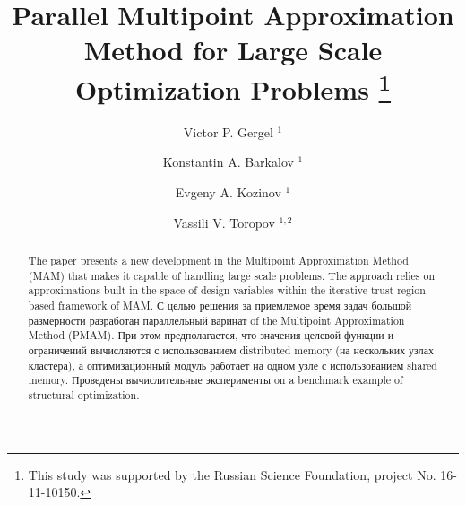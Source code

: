 \documentclass[runningheads,a4paper]{llncs}
\begin{document}
\mainmatter  %

\title{Parallel Multipoint Approximation Method for Large Scale Optimization Problems 
\thanks{This study was supported by the Russian Science Foundation, project No. 16-11-10150.}}


\author{ Victor P. Gergel%
$^1$ \and
Konstantin A. Barkalov%
$^1$ \and
Evgeny A. Kozinov%
$^1$ \and
Vassili V. Toropov%
$^{1,2}$
}
%


%
%

\maketitle

\begin{abstract}
The paper presents a new development in the Multipoint Approximation Method (MAM) that makes it capable of handling large scale problems. The approach relies on approximations built in the space of design variables within the iterative trust-region-based framework of MAM. 
\Russian
С целью решения за приемлемое время задач большой размерности разработан параллельный варинат of the Multipoint Approximation Method (PMAM). При этом предполагается, что значения целевой функции и ограничений вычисляются с использованием distributed memory (на нескольких узлах кластера), а оптимизационный модуль работает на одном узле с использованием shared memory. Проведены вычислительные эксперименты on a benchmark example of structural optimization.

\end{abstract}
\end{document}
